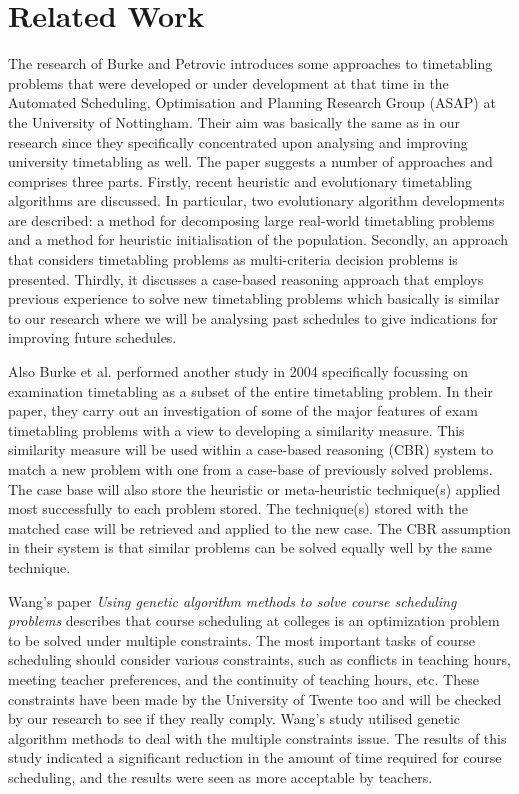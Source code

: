 \section{Related Work}
The research of Burke and Petrovic \cite{recentResearchDirectionsInAutomatedTimetabling} introduces some approaches to timetabling problems that were developed or under development at that time in the Automated Scheduling, Optimisation and Planning Research Group (ASAP) at the University of Nottingham. Their aim was basically the same as in our research since they specifically concentrated upon analysing and improving university timetabling as well. The paper suggests a number of approaches and comprises three parts. Firstly, recent heuristic and evolutionary timetabling algorithms are discussed. In particular, two evolutionary algorithm developments are described: a method for decomposing large real-world timetabling problems and a method for heuristic initialisation of the population. Secondly, an approach that considers timetabling problems as multi-criteria decision problems is presented. Thirdly, it discusses a case-based reasoning approach that employs previous experience to solve new timetabling problems which basically is similar to our research where we will be analysing past schedules to give indications for improving future schedules.

Also Burke et al. performed another study in 2004 \cite{burke2004analysing} specifically focussing on examination timetabling as a subset of the entire timetabling problem. In their paper, they carry out an investigation of some of the major features of exam timetabling problems with a view to developing a similarity measure. This similarity measure will be used within a case-based reasoning (CBR) system to match a new problem with one from a case-base of previously solved problems. The case base will also store the heuristic or meta-heuristic technique(s) applied most successfully to each problem stored. The technique(s) stored with the matched case will be retrieved and applied to the new case. The CBR assumption in their system is that similar problems can be solved equally well by the same technique.

Wang's paper \textit{Using genetic algorithm methods to solve course scheduling problems} \cite{usingGeneticAlgorithmMethodsToSolveScheduling} describes that course scheduling at colleges is an optimization problem to be solved under multiple constraints. The most important tasks of course scheduling should consider various constraints, such as conflicts in teaching hours, meeting teacher preferences, and the continuity of teaching hours, etc. These constraints have been made by the University of Twente too and will be checked by our research to see if they really comply. Wang's study utilised genetic algorithm methods to deal with the multiple constraints issue. The results of this study indicated a significant reduction in the amount of time required for course scheduling, and the results were seen as more acceptable by teachers.

